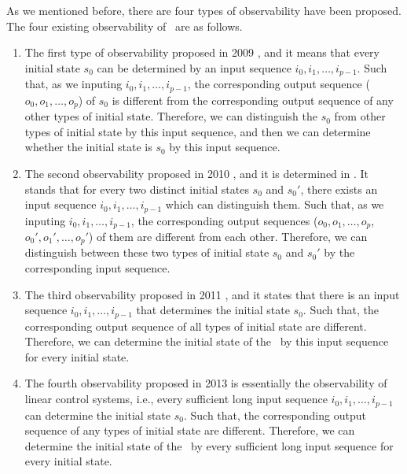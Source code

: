 As we mentioned before, there are four types of observability have been proposed. The four existing observability of \BCNs\ are as follows.
\begin{enumerate}
	\item The first type of observability proposed in 2009 \cite{cheng2009controllability}, and it means that every initial state $s_0$ can be determined by an input sequence $i_0, i_1,\ldots, i_{p-1}$. Such that, as we inputing $i_0, i_1,\ldots, i_{p-1}$, the corresponding output sequence ($o_0, o_1,\ldots, o_{p}$) of $s_0$ is different from the corresponding output sequence of any other types of initial state. Therefore, we can distinguish the $s_0$ from other types of initial state by this input sequence, and then we can determine whether the initial state is $s_0$ by this input sequence.
	\item 
	The second observability proposed in 2010 \cite{Zhao2010Input}, and it is determined in \cite{Li2015Controllability}. It stands that for every two distinct initial states $s_0$ and $s_0'$, there exists an input sequence $i_0, i_1,\ldots, i_{p-1}$ which can distinguish them. Such that, as we inputing $i_0, i_1,\ldots, i_{p-1}$, the corresponding output sequences ($o_0, o_1,\ldots, o_{p}$, $o_0', o_1',\ldots, o_{p}'$) of them are different from each other. Therefore, we can distinguish between these two types of initial state $s_0$ and $s_0'$ by the corresponding input sequence.	
	\item The third observability proposed in 2011 \cite{Cheng2011Identification}, and it states that there is an input sequence $i_0, i_1,\ldots, i_{p-1}$ that determines the initial state $s_0$. Such that, the corresponding output sequence of all types of initial state are different. Therefore, we can determine the initial state of the \BCN\ by this input sequence for every initial state.
	
	\item  The fourth observability proposed in 2013 \cite{Fornasini2013Observability} is essentially the observability of linear control systems, i.e., every sufficient long input sequence $i_0, i_1,\ldots, i_{p-1}$ can determine the initial state $s_0$. Such that, the corresponding output sequence of any types of initial state are different. Therefore, we can determine the initial state of the \BCN\ by every sufficient long input sequence for every initial state.
\end{enumerate}
 

